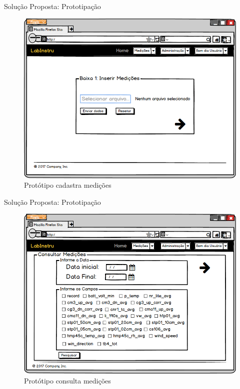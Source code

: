 \begin{frame}{Solução Proposta: Prototipação}
\begin{figure}[h!]
\centering
\includegraphics[width=0.6\linewidth]{./img/tela053}
\caption{Protótipo cadastra medições} \label{fig:uc001}
\end{figure}
\end{frame}

\begin{frame}{Solução Proposta: Prototipação}
\begin{figure}[h!]
\centering
\includegraphics[width=0.6\linewidth]{./img/tela058}
\caption{Protótipo consulta medições} \label{fig:uc001}
\end{figure}
\end{frame}



